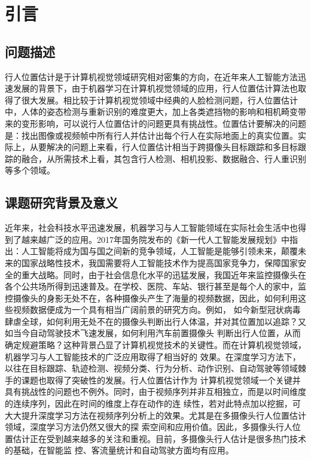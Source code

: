 
\chapter{引言}

\section{问题描述}

行人位置估计是于计算机视觉领域研究相对密集的方向，在近年来人工智能方法迅速发展的背景下，由于机器学习在计算机视觉领域的应用，行人位置估计算法也取得了很大发展。相比较于计算机视觉领域中经典的人脸检测问题，行人位置估计中，人体的姿态检测与重新识别的难度更大，加上各类遮挡物的影响和相机畸变带来的变形影响，可以说行人位置估计的问题更具有挑战性。位置估计要解决的问题是：找出图像或视频帧中所有行人并估计出每个行人在实际地面上的真实位置。实际上，从要解决的问题上来看，行人位置估计相当于跨摄像头目标跟踪和多目标跟踪的融合，从所需技术上看，其包含行人检测、相机投影、数据融合、行人重识别等多个领域。


\section{课题研究背景及意义}

近年来，社会科技水平迅速发展，机器学习与人工智能领域在实际社会生活中也得到了越来越广泛的应用。2017年国务院发布的《新一代人工智能发展规划》\cite{developPlan}中指出：人工智能将成为国与国之间新的竞争领域，人工智能是能够引领未来，颠覆未来的国家战略性技术，我国需要将人工智能技术作为提高国家竞争力，保障国家安全的重大战略。同时，由于社会信息化水平的迅猛发展，我国近年来监控摄像头在各个公共场所得到迅速普及。在学校、医院、车站、银行甚至是每个人的家中，监控摄像头的身影无处不在，各种摄像头产生了海量的视频数据，因此，如何利用这些视频数据便成为一个具有相当广阔前景的研究方向。例如，
如今新型冠状病毒肆虐全球，如何利用无处不在的摄像头判断出行人体温，并对其位置加以追踪？又如当今自动驾驶技术飞速发展，如何利用汽车前置摄像头
判断出行人位置，从而确定规避策略？这种背景凸显了计算机视觉技术的关键性。而在计算机视觉领域，机器学习与人工智能技术的广泛应用取得了相当好的
效果。在深度学习方法下，以往在目标跟踪、轨迹检测、视频分类、行为分析、动作识别、自动驾驶等领域棘手的课题也取得了突破性的发展。行人位置估计作为
计算机视觉领域一个关键并具有挑战性的问题也不例外。同时，由于视频序列并非互相独立，而是以时间维度的连续序列，因此在时间的维度上存在动作的连
续性，若对此特点加以挖掘，可大大提升深度学习方法在视频序列分析上的效果。尤其是在多摄像头行人位置估计领域，深度学习方法仍然又很大的探
索空间和应用价值。因此，多摄像头行人位置估计正在受到越来越多的关注和重视。目前，多摄像头行人估计是很多热门技术的基础，在智能监
控、客流量统计和自动驾驶方面均有应用。
	
